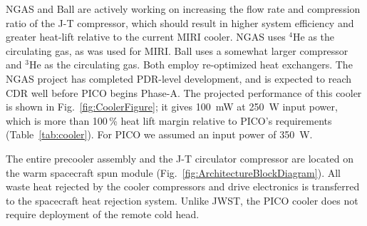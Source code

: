 NGAS and Ball are actively working on increasing the flow rate and compression ratio of the J-T compressor,  which should result in higher system efficiency and greater heat-lift relative to the current MIRI cooler. 
NGAS uses $^4$He as the circulating gas, as was used for MIRI. Ball uses a somewhat larger compressor and $^3$He as the circulating gas. Both employ re-optimized heat exchangers. The NGAS project has completed PDR-level development, and is expected to reach CDR well before PICO begins Phase-A. The projected performance of this cooler is shown in Fig.~\ref{fig:CoolerFigure}; it gives 100~mW at 250~W input power, which is more than 100\,\% heat lift margin relative to PICO's requirements (Table~\ref{tab:cooler}). For PICO we assumed an input power of 350~W.

The entire precooler assembly and the J-T circulator compressor are located on the warm spacecraft spun module (Fig.~\ref{fig:ArchitectureBlockDiagram}).
All waste heat rejected by the cooler compressors and drive electronics is transferred to the spacecraft heat rejection system. Unlike JWST, the PICO cooler does not require deployment of the remote cold head.



